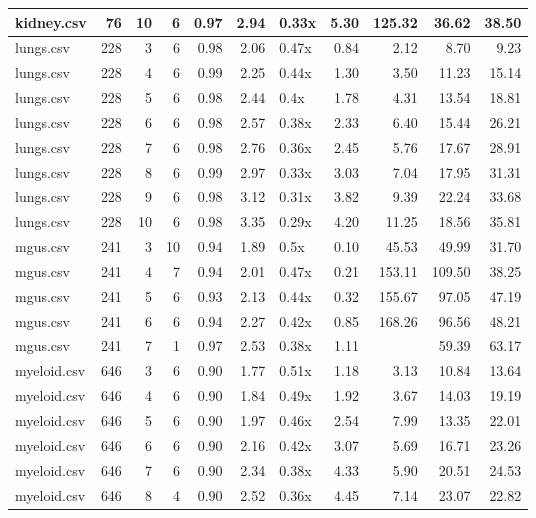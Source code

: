 \begin{table}[ht]
\begin{tabular}{lrrrrrlrrrr}
   \hline
kidney.csv &  76 &  10 &   6 & 0.97 & 2.94 & 0.33x & 5.30 & 125.32 & 36.62 & 38.50 \\ 
   \hline
lungs.csv & 228 &   3 &   6 & 0.98 & 2.06 & 0.47x & 0.84 & 2.12 & 8.70 & 9.23 \\ 
   \hline
lungs.csv & 228 &   4 &   6 & 0.99 & 2.25 & 0.44x & 1.30 & 3.50 & 11.23 & 15.14 \\ 
   \hline
lungs.csv & 228 &   5 &   6 & 0.98 & 2.44 & 0.4x & 1.78 & 4.31 & 13.54 & 18.81 \\ 
   \hline
lungs.csv & 228 &   6 &   6 & 0.98 & 2.57 & 0.38x & 2.33 & 6.40 & 15.44 & 26.21 \\ 
   \hline
lungs.csv & 228 &   7 &   6 & 0.98 & 2.76 & 0.36x & 2.45 & 5.76 & 17.67 & 28.91 \\ 
   \hline
lungs.csv & 228 &   8 &   6 & 0.99 & 2.97 & 0.33x & 3.03 & 7.04 & 17.95 & 31.31 \\ 
   \hline
lungs.csv & 228 &   9 &   6 & 0.98 & 3.12 & 0.31x & 3.82 & 9.39 & 22.24 & 33.68 \\ 
   \hline
lungs.csv & 228 &  10 &   6 & 0.98 & 3.35 & 0.29x & 4.20 & 11.25 & 18.56 & 35.81 \\ 
   \hline
mgus.csv & 241 &   3 &  10 & 0.94 & 1.89 & 0.5x & 0.10 & 45.53 & 49.99 & 31.70 \\ 
   \hline
mgus.csv & 241 &   4 &   7 & 0.94 & 2.01 & 0.47x & 0.21 & 153.11 & 109.50 & 38.25 \\ 
   \hline
mgus.csv & 241 &   5 &   6 & 0.93 & 2.13 & 0.44x & 0.32 & 155.67 & 97.05 & 47.19 \\ 
   \hline
mgus.csv & 241 &   6 &   6 & 0.94 & 2.27 & 0.42x & 0.85 & 168.26 & 96.56 & 48.21 \\ 
   \hline
mgus.csv & 241 &   7 &   1 & 0.97 & 2.53 & 0.38x & 1.11 &  & 59.39 & 63.17 \\ 
   \hline
myeloid.csv & 646 &   3 &   6 & 0.90 & 1.77 & 0.51x & 1.18 & 3.13 & 10.84 & 13.64 \\ 
   \hline
myeloid.csv & 646 &   4 &   6 & 0.90 & 1.84 & 0.49x & 1.92 & 3.67 & 14.03 & 19.19 \\ 
   \hline
myeloid.csv & 646 &   5 &   6 & 0.90 & 1.97 & 0.46x & 2.54 & 7.99 & 13.35 & 22.01 \\ 
   \hline
myeloid.csv & 646 &   6 &   6 & 0.90 & 2.16 & 0.42x & 3.07 & 5.69 & 16.71 & 23.26 \\ 
   \hline
myeloid.csv & 646 &   7 &   6 & 0.90 & 2.34 & 0.38x & 4.33 & 5.90 & 20.51 & 24.53 \\ 
   \hline
myeloid.csv & 646 &   8 &   4 & 0.90 & 2.52 & 0.36x & 4.45 & 7.14 & 23.07 & 22.82 \\ 

\end{tabular}
\end{table}
